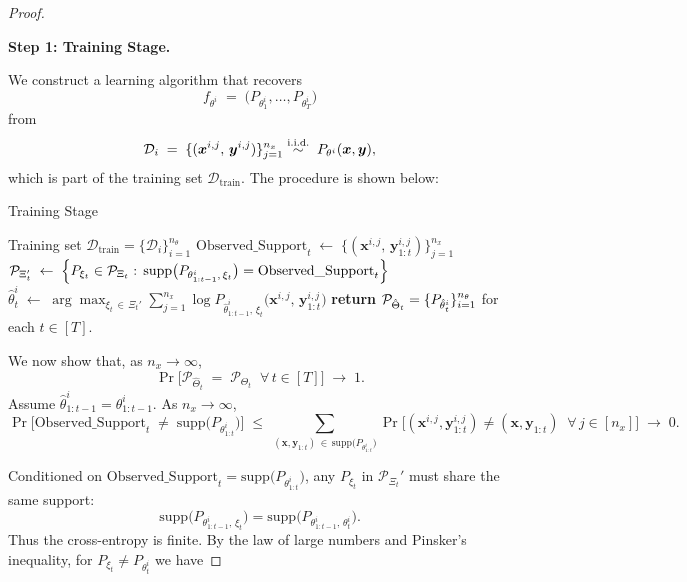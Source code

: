 \begin{proof}\textbf{}
    


\textbf{Step 1: Training Stage.}

We construct a learning algorithm that recovers
\[
f_{\theta^i} \;=\; \bigl(P_{\theta_1^i},\dots,P_{\theta_T^i}\bigr)
\]
from 
\[
\mathcal{D}_i \;=\; \{(\bm x^{i,j},\, \bm y^{i,j})\}_{j=1}^{n_x}
\overset{\text{i.i.d.}}{\sim}\;  P_{\theta^i}(\bm x,\bm y),
\]
which is part of the training set $\mathcal{D}_{\mathrm{train}}$. The procedure is shown below:

\begin{algorithm}[H]
\caption{Training Stage}
\begin{algorithmic}[1]
\Require Training set $\mathcal{D}_{\mathrm{train}}=\{\mathcal{D}_i\}_{i=1}^{n_\theta}$
    \State $\mathrm{Observed\_Support}_t \;\gets\; \{(\bm x^{i,j},\,\bm y^{i,j}_{1:t})\}_{j=1}^{n_x}$
    \State $\mathcal{P}_{\Xi_t'} \;\gets\;
            \Bigl\{
              P_{\xi_t}\in \mathcal{P}_{\Xi_t}
              :\, \mathrm{supp}\bigl(P_{\theta^i_{1:t-1},\,\xi_t}\bigr)
              = \mathrm{Observed\_Support}_t
            \Bigr\}$
    \State $\hat{\theta}_t^i \;\gets\;
           \displaystyle \arg\max_{\xi_t \,\in\, \Xi_t'} 
           \sum_{j=1}^{n_x} \log 
             P_{\hat{\theta}_{1:t-1}^i,\,\xi_t}\!\bigl(\bm x^{i,j},\, \bm y^{i,j}_{1:t}\bigr)$
  \EndFor
\EndFor
\State \textbf{return} ${\mathcal{P}}_{\hat\Theta_t}=\{{P}_{\hat{\theta}_t^i}\}_{i=1}^{n_\theta}$ for each $t\in[T]$.
\end{algorithmic}
\end{algorithm}

We now show that, as $n_x \to \infty$, 
\[
\Pr\bigl[
  \mathcal{P}_{\hat{\Theta}_t} \;=\; \mathcal{P}_{\Theta_t}
  \;\;\forall\,t \in [T]
\bigr] \;\rightarrow\;1.
\]
Assume $\hat{\theta}^i_{1:t-1} = \theta^i_{1:t-1}$. As $n_x\to \infty$,
\[
\Pr\bigl[
  \mathrm{Observed\_Support}_t \;\neq\; \mathrm{supp}\bigl(P_{\theta^i_{1:t}}\bigr)
\bigr]
\;\le\;
\sum_{(\bm x,\bm y_{1:t}) \,\in\, \mathrm{supp}\bigl(P_{\theta^i_{1:t}}\bigr)}
\Pr\bigl[
  (\bm x^{i,j},\bm y^{i,j}_{1:t}) \neq (\bm x,\bm y_{1:t}) \;\;\forall\,j \in [n_x]
\bigr]
\;\to\; 0.
\]

Conditioned on
$\mathrm{Observed\_Support}_t 
  = \mathrm{supp}\bigl(P_{\theta^i_{1:t}}\bigr)$,
any $P_{\xi_t}$ in $\mathcal{P}_{\Xi_t}'$ must share the same support:
\[
\mathrm{supp}\bigl(P_{\theta^i_{1:t-1},\,\xi_t}\bigr)
=
\mathrm{supp}\bigl(P_{\theta^i_{1:t-1},\,\theta_t^i}\bigr).
\]
Thus the cross-entropy is finite. By the law of large numbers and Pinsker’s inequality, for $P_{\xi_t} \neq P_{\theta_t^i}$ we have


\end{proof}
